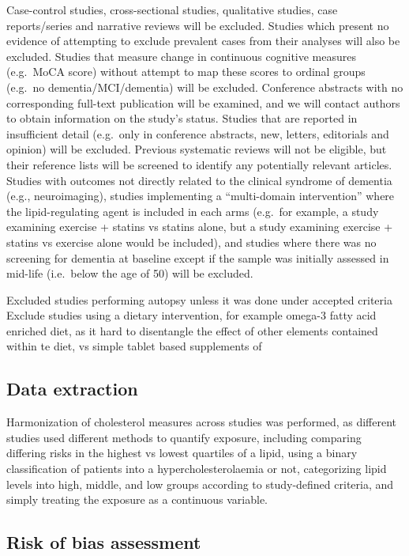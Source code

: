 \documentclass[a4paper, twoside]{templates/ociamthesis}
\begin{document}
Case-control studies, cross-sectional studies, qualitative studies, case reports/series and narrative reviews will be excluded. Studies which present no evidence of attempting to exclude prevalent cases from their analyses will also be excluded. Studies that measure change in continuous cognitive measures (e.g.~MoCA score) without attempt to map these scores to ordinal groups (e.g.~no dementia/MCI/dementia) will be excluded. Conference abstracts with no corresponding full-text publication will be examined, and we will contact authors to obtain information on the study's status. Studies that are reported in insufficient detail (e.g.~only in conference abstracts, new, letters, editorials and opinion) will be excluded. Previous systematic reviews will not be eligible, but their reference lists will be screened to identify any potentially relevant articles. Studies with outcomes not directly related to the clinical syndrome of dementia (e.g., neuroimaging), studies implementing a ``multi-domain intervention'' where the lipid-regulating agent is included in each arms (e.g.~for example, a study examining exercise + statins vs statins alone, but a study examining exercise + statins vs exercise alone would be included), and studies where there was no screening for dementia at baseline except if the sample was initially assessed in mid-life (i.e.~below the age of 50) will be excluded.

Excluded studies performing autopsy unless it was done under accepted criteria Exclude studies using a dietary intervention, for example omega-3 fatty acid enriched diet, as it hard to disentangle the effect of other elements contained within te diet, vs simple tablet based supplements of

\hypertarget{data-extraction}{%
\subsection{Data extraction}\label{data-extraction}}

Harmonization of cholesterol measures across studies was performed, as different studies used different methods to quantify exposure, including comparing differing risks in the highest vs lowest quartiles of a lipid, using a binary classification of patients into a hypercholesterolaemia or not, categorizing lipid levels into high, middle, and low groups according to study-defined criteria, and simply treating the exposure as a continuous variable.

\hypertarget{risk-of-bias}{%
\subsection{Risk of bias assessment}\label{risk-of-bias}}
\end{document}
